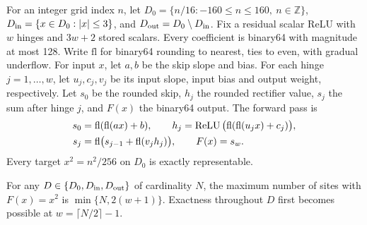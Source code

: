 For an integer grid index \(n\), let \(D_0=\{n/16:-160\le n\le160,\ n\in\mathbb Z\}\), \(D_{\rm in}=\{x\in D_0:|x|\le3\}\), and \(D_{\rm out}=D_0\setminus D_{\rm in}\). Fix a residual scalar ReLU with \(w\) hinges and \(3w+2\) stored scalars. Every coefficient is binary64 with magnitude at most 128. Write \(\mathrm{fl}\) for binary64 rounding to nearest, ties to even, with gradual underflow. For input \(x\), let \(a,b\) be the skip slope and bias. For each hinge \(j=1,\ldots,w\), let \(u_j,c_j,v_j\) be its input slope, input bias and output weight, respectively. Let \(s_0\) be the rounded skip, \(h_j\) the rounded rectifier value, \(s_j\) the sum after hinge \(j\), and \(F(x)\) the binary64 output. The forward pass is
\[
\begin{aligned}
s_0&=\mathrm{fl}(\mathrm{fl}(ax)+b),\qquad
h_j=\operatorname{ReLU}\big(\mathrm{fl}(\mathrm{fl}(u_jx)+c_j)\big),\\
s_j&=\mathrm{fl}\big(s_{j-1}+\mathrm{fl}(v_j h_j)\big),\qquad F(x)=s_w.
\end{aligned}
\]
Every target \(x^2=n^2/256\) on \(D_0\) is exactly representable.

\begin{theorem}\label{th:lattice-square}
For any \(D\in\{D_0,D_{\rm in},D_{\rm out}\}\) of cardinality \(N\), the maximum number of sites with \(F(x)=x^2\) is \(\min\{N,2(w+1)\}\). Exactness throughout \(D\) first becomes possible at \(w=\lceil N/2\rceil-1\).
\end{theorem}

